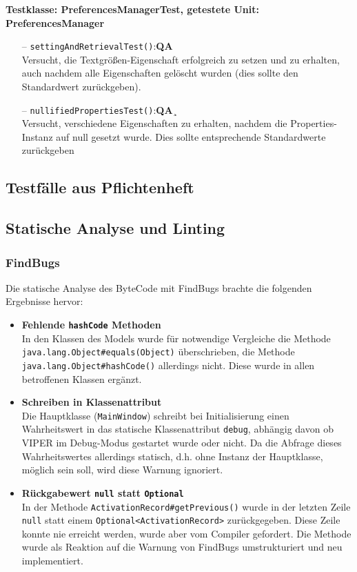 \documentclass[parskip=full,11pt,twoside]{scrartcl}
\def\qa{\hfill\textbf{QA}}
\begin{document}
\textbf{Testklasse: PreferencesManagerTest, getestete Unit: PreferencesManager}
\begin{itemize}
	\item[--] \texttt{settingAndRetrievalTest()}:\qa\\
	Versucht, die Textgrößen-Eigenschaft erfolgreich zu setzen und zu erhalten, auch nachdem alle Eigenschaften gelöscht wurden (dies sollte den Standardwert zurückgeben).
	\item[--] \texttt{nullifiedPropertiesTest()}:\qa¸\\
	Versucht, verschiedene Eigenschaften zu erhalten, nachdem die Properties-Instanz auf null gesetzt wurde. Dies sollte entsprechende Standardwerte zurückgeben
\end{itemize}

\subsection{Testfälle aus Pflichtenheft}

\subsection{Statische Analyse und Linting}

\subsubsection{FindBugs}

Die statische Analyse des ByteCode mit FindBugs brachte die folgenden Ergebnisse hervor:

\begin{itemize}
  \item \textbf{Fehlende \texttt{hashCode} Methoden}\\
        In den Klassen des Models wurde für notwendige Vergleiche die Methode \texttt{java.lang.Object\#equals(Object)} überschrieben, die Methode \texttt{java.lang.Object\#hashCode()} allerdings nicht. Diese wurde in allen betroffenen Klassen ergänzt.
  \item \textbf{Schreiben in Klassenattribut}\\
        Die Hauptklasse (\texttt{MainWindow}) schreibt bei Initialisierung einen Wahrheitswert in das statische Klassenattribut \texttt{debug}, abhängig davon ob VIPER im Debug-Modus gestartet wurde oder nicht. Da die Abfrage dieses Wahrheitswertes allerdings statisch, d.h. ohne Instanz der Hauptklasse, möglich sein soll, wird diese Warnung ignoriert.
  \item \textbf{Rückgabewert \texttt{null} statt \texttt{Optional}}\\
        In der Methode \texttt{ActivationRecord\#getPrevious()} wurde in der letzten Zeile \texttt{null} statt einem \texttt{Optional<ActivationRecord>} zurückgegeben. Diese Zeile konnte nie erreicht werden, wurde aber vom Compiler gefordert. Die Methode wurde als Reaktion auf die Warnung von FindBugs umstrukturiert und neu implementiert.
\end{itemize}
\end{document}
